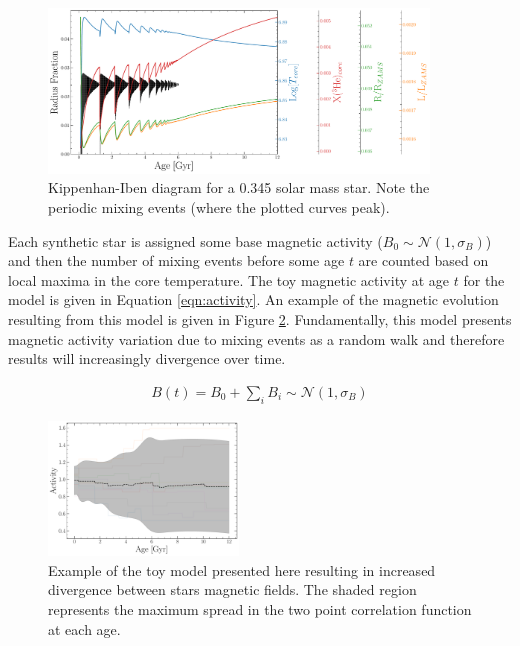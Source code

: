 \begin{figure}
  \centering
  \includegraphics[width=0.9\textwidth]{figures/Kippenhan_clamped.pdf}
  \caption{Kippenhan-Iben diagram for a 0.345 solar mass star. Note the
  periodic mixing events (where the plotted curves peak).}
  \label{fig:kippenhan}
\end{figure}

Each synthetic star is assigned some base magnetic activity ($B_{0} \sim
\mathcal{N}(1, \sigma_{B})$) and then the number of mixing events before some age $t$
are counted based on local maxima in the core temperature. The toy magnetic
activity at age $t$ for the model is given in Equation \ref{eqn:activity}. An
example of the magnetic evolution resulting from this model is given in Figure
\ref{fig:simpleB}. Fundamentally, this model presents magnetic
activity variation due to mixing events as a random walk and therefore results will
increasingly divergence over time.

\begin{align}\label{eqn:activity}
  B(t) = B_{0} + \sum_{i}B_{i} \sim \mathcal{N}(1, \sigma_{B}) 
\end{align}

\begin{figure}
  \centering
  \includegraphics[width=0.45\textwidth]{figures/simpleBEvolution.pdf}
  \caption{Example of the toy model presented here resulting in increased
  divergence between stars magnetic fields. The shaded region represents the
  maximum spread in the two point correlation function at each age.}
  \label{fig:simpleB}
\end{figure}

